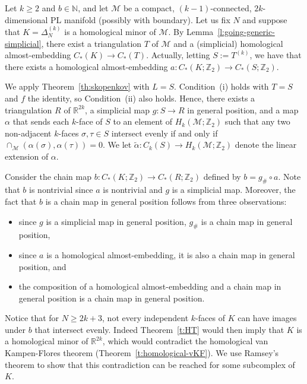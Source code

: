 \documentclass[a4paper,UKenglish,thm-restate]{article}
\newcommand{\R}{\mathbb{R}}
\newcommand{\Z}{\mathbb{Z}}
\newcommand{\N}{\mathbb{N}}
\newcommand{\M}{\mathcal{M}}
\begin{document}
\medskip

 Let $k \ge 2$ and $b \in \N$, and let $\M$ be a compact, $(k-1)$-connected, $2k$-dimensional PL manifold (possibly with boundary). Let us fix $N$ and suppose that $K = \Delta_N^{(k)}$ is a homological minor of $\M$. By Lemma~\ref{l:going-generic-simplicial}, there exist a triangulation $T$ of $\M$ and a (simplicial) homological almost-embedding $C_*(K)\to C_*(T)$. Actually, letting $S := T^{(k)}$, we have that there exists a homological almost-embedding $a:C_*(K;\Z_2) \to  C_*(S;\Z_2)$.

  \medskip

  We apply Theorem~\ref{th:skopenkov} with $L=S$. Condition~(i) holds with $T=S$ and $f$ the identity, so Condition~(ii) also holds. Hence, there exists a triangulation $R$ of $\R^{2k}$, a simplicial map $g:S \to R$ in general position, and a map $\alpha$ that sends each $k$-face of $S$ to an element of $H_k(\M;\Z_2)$ such that any two non-adjacent $k$-faces $\sigma,\tau \in S$ intersect evenly if and only if $\cap_{\M}(\alpha(\sigma),\alpha(\tau)) = 0$. We let $\tilde{\alpha}:C_k(S) \to H_k(\M;\Z_2)$ denote the linear extension of $\alpha$.

\medskip

Consider the chain map $b:C_*(K;\Z_2) \to C_*(R;\Z_2)$ defined by $b = g_\# \circ a$. Note that $b$ is nontrivial since $a$ is nontrivial and $g$ is a simplicial map. Moreover, the fact that $b$ is a chain map in general position follows from three observations:

\begin{itemize}
\item since $g$ is a simplicial map in general position, $g_\#$ is a chain map in general position,
\item since $a$ is a homological almost-embedding, it is also a chain map in general position, and 
\item the composition of a homological almost-embedding and a chain map in general position is a chain map in general position.
\end{itemize}

\noindent
Notice that for $N \ge 2k+3$, not every independent $k$-faces of $K$ can have images under $b$ that intersect evenly. Indeed Theorem~\ref{t:HT} would then imply that $K$ is a homological minor of $\R^{2k}$, which would contradict the homological van Kampen-Flores theorem (Theorem~\ref{t:homological-vKF}). We use Ramsey's theorem to show that this contradiction can be reached for some subcomplex of $K$.
\end{document}
